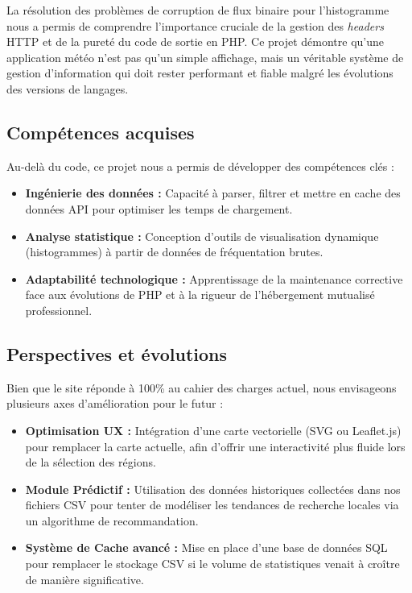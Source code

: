 \documentclass[12pt,a4paper]{article}
\begin{document}
La résolution des problèmes de corruption de flux binaire pour l'histogramme nous a permis de comprendre l'importance cruciale de la gestion des \textit{headers} HTTP et de la pureté du code de sortie en PHP. Ce projet démontre qu'une application météo n'est pas qu'un simple affichage, mais un véritable système de gestion d'information qui doit rester performant et fiable malgré les évolutions des versions de langages.

\subsection{Compétences acquises}
Au-delà du code, ce projet nous a permis de développer des compétences clés :
\begin{itemize}
    \item \textbf{Ingénierie des données :} Capacité à parser, filtrer et mettre en cache des données API pour optimiser les temps de chargement.
    \item \textbf{Analyse statistique :} Conception d'outils de visualisation dynamique (histogrammes) à partir de données de fréquentation brutes.
    \item \textbf{Adaptabilité technologique :} Apprentissage de la maintenance corrective face aux évolutions de PHP et à la rigueur de l'hébergement mutualisé professionnel.
\end{itemize}

\subsection{Perspectives et évolutions}
Bien que le site réponde à 100\% au cahier des charges actuel, nous envisageons plusieurs axes d'amélioration pour le futur :
\begin{itemize}
    \item \textbf{Optimisation UX :} Intégration d'une carte vectorielle (SVG ou Leaflet.js) pour remplacer la carte actuelle, afin d'offrir une interactivité plus fluide lors de la sélection des régions.
    \item \textbf{Module Prédictif :} Utilisation des données historiques collectées dans nos fichiers CSV pour tenter de modéliser les tendances de recherche locales via un algorithme de recommandation.
    \item \textbf{Système de Cache avancé :} Mise en place d'une base de données SQL pour remplacer le stockage CSV si le volume de statistiques venait à croître de manière significative.
\end{itemize}
\end{document}
